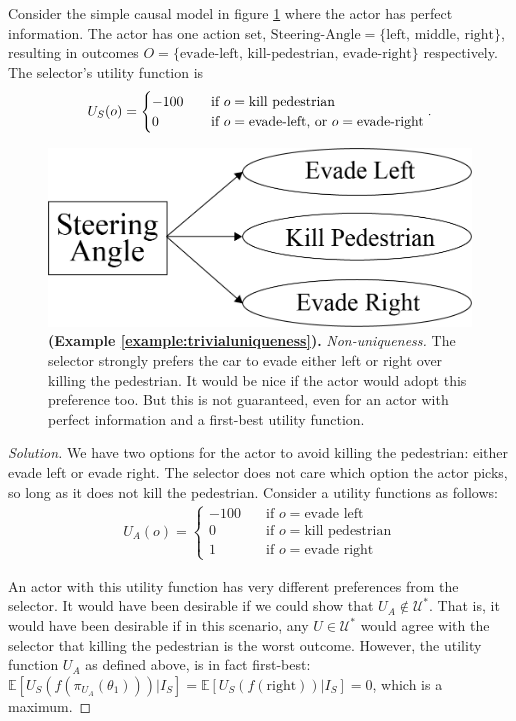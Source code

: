 \begin{example}\label{example:trivialuniqueness}
	\textnormal{Consider the simple causal model in figure \ref{fig:evasionexample} where the actor has perfect information. The actor has one action set, $\text{Steering-Angle}=\{\text{left, middle, right} \}$, resulting in outcomes $O=\{ \text{evade-left, kill-pedestrian, evade-right}\}$ respectively. The selector's utility function is \[U_S(o)=\begin{cases}-100\quad &\text{if } o=\text{kill pedestrian}\\
			0\quad &\text{if }o=\text{evade-left, or }o= \text{evade-right}\end{cases}\\
		.\] }
\end{example}
\begin{figure}[H]
	\centering
	\captionsetup{labelfont=bf,font=small,labelsep=none}
	\includegraphics[width=0.4\linewidth]{"images/theorem-examples/evasionexample"}
	\caption{\rightskip=20pt\leftskip=20pt \textbf{ (Example \ref{example:trivialuniqueness}).} \textit{Non-uniqueness.} The selector strongly prefers the car to evade either left or right over killing the pedestrian. It would be nice if the actor would adopt this preference too. But this is not guaranteed, even for an actor with perfect information and a first-best utility function.
	}
	\label{fig:evasionexample} 	
\end{figure}

\begin{proof}[Solution]
	We have two options for the actor to avoid killing the pedestrian: either evade left or evade right. The selector does not care which option the actor picks, so long as it does not kill the pedestrian. Consider a utility functions as follows:
	\begin{align*}
	U_A(o)=\begin{cases}
	-100\quad &\text{if }o=\text{evade left}\\
	0\quad &\text{if }o=\text{kill pedestrian}\\
	1\quad &\text{if }o=\text{evade right}
	\end{cases}
	\end{align*} 
	
	An actor with this utility function has very different preferences from the selector. It would have been desirable if we could show that $U_A\notin \mathcal U^*$. That is, it would have been desirable if in this scenario, any $U\in \mathcal U^*$ would agree with the selector that killing the pedestrian is the worst outcome. However, the utility function $U_A$ as defined above, is in fact first-best: $\mathbb E[U_S(f(\pi_{U_A}(\theta_1)))|I_S]=\mathbb E[U_S(f(\text{right}))|I_S]=0$, which is a maximum.
\end{proof}


